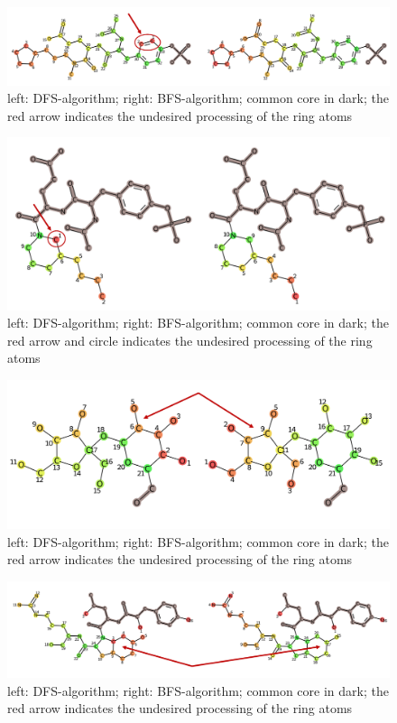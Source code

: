 \begin{figure}
\includegraphics[scale=1.5]{simple_ring_exampledfs2}\caption{left: DFS-algorithm; right: BFS-algorithm; common core in dark; the
red arrow indicates the undesired processing of the ring atoms}

\end{figure}

\begin{figure}
\includegraphics[scale=1.3]{simple_ring_exampledfs3}\caption{left: DFS-algorithm; right: BFS-algorithm; common core in dark; the
red arrow and circle indicates the undesired processing of the ring
atoms}

\end{figure}
\begin{figure}

\includegraphics[scale=0.5]{simple_ring_exampledfs4}\caption{left: DFS-algorithm; right: BFS-algorithm; common core in dark; the
red arrow indicates the undesired processing of the ring atoms}

\end{figure}

\begin{figure}

\includegraphics[scale=0.5]{2ring_example}\caption{left: DFS-algorithm; right: BFS-algorithm; common core in dark; the
red arrow indicates the undesired processing of the ring atoms}

\end{figure}

